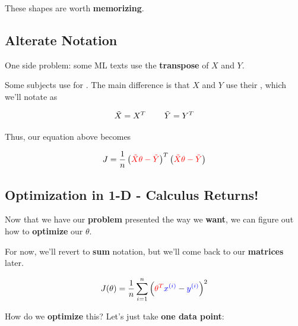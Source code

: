         These shapes are worth \textbf{memorizing}.
        
    \subsection{Alterate Notation}
    
        One side problem: some ML texts use the \textbf{transpose} of $X$ and $Y$.\\
    
        \begin{notation}
            Some subjects use  for . The main difference is that $X$ and $Y$ use their , which we'll notate as
        
            \begin{equation*}
                \tilde{X} = X^T \;\;\;\;\;\;\;\; \tilde{Y} = Y^T
            \end{equation*}
            
            Thus, our equation above becomes
            
            \begin{equation*}
                J = \frac{1}{n}
                    \left( \textcolor{red}{ \tilde{X} \theta  - \tilde{Y} } \right)^T
                    \left( \textcolor{red}{ \tilde{X} \theta  - \tilde{Y} } \right) 
            \end{equation*}
        \end{notation}
        
    \subsection{Optimization in 1-D - Calculus Returns!}
    
        Now that we have our \textbf{problem} presented the way we \textbf{want}, we can figure out how to \textbf{optimize} our $\theta$.
        
        For now, we'll revert to \textbf{sum} notation, but we'll come back to our \textbf{matrices} later.
        
        \begin{equation}
            J(\theta) = 
            \frac{1}{n}  \sum_{i=1}^n 
            \left( \textcolor{red}{\theta^T} \textcolor{blue}{x^{(i)}}  
            - \textcolor{blue}{y^{(i)}} \right)^2 
        \end{equation}
        
        How do we \textbf{optimize} this? Let's just take \textbf{one data point}:
        
